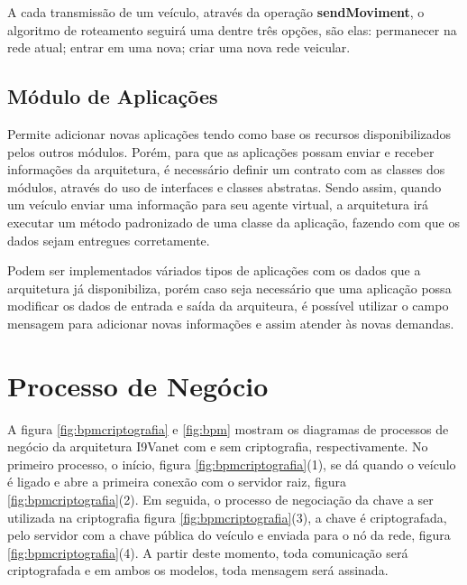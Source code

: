 \documentclass[
	12pt,				%
	oneside,			%
	a4paper,			%
	english,			%
	brazil				%
	]{abntex2ppgsi}
\begin{document}
A cada transmissão de um veículo, através da operação \textbf{sendMoviment}, o algoritmo de roteamento seguirá uma dentre três opções, são elas: permanecer na rede atual; entrar em uma nova; criar uma nova rede veicular.




\subsection{Módulo de Aplicações}
Permite adicionar novas aplicações tendo como base os recursos disponibilizados pelos outros módulos. Porém, para que as aplicações possam enviar e receber informações da arquitetura, é necessário definir um contrato com as classes dos módulos, através do uso de interfaces e classes abstratas. Sendo assim, quando um veículo enviar uma informação para seu agente virtual, a arquitetura irá executar um método padronizado de uma classe da aplicação, fazendo com que os dados sejam entregues corretamente.

Podem ser implementados váriados tipos de aplicações com os dados que a arquitetura já disponibiliza, porém caso seja necessário que uma aplicação possa modificar os dados de entrada e saída da arquiteura, é possível utilizar o campo mensagem para adicionar novas informações e assim atender às novas demandas.

\section{Processo de Negócio}

A figura \ref{fig:bpmcriptografia} e \ref{fig:bpm} mostram os diagramas de processos de negócio da arquitetura I9Vanet com e sem criptografia, respectivamente. No primeiro processo, o início, figura \ref{fig:bpmcriptografia}(1), se dá quando o veículo é ligado e abre a primeira conexão com o servidor raiz, figura \ref{fig:bpmcriptografia}(2). Em seguida, o processo de negociação da chave a ser utilizada na criptografia figura \ref{fig:bpmcriptografia}(3), a chave é criptografada, pelo servidor com a chave pública do veículo e enviada  para o nó da rede, figura \ref{fig:bpmcriptografia}(4). A partir deste momento, toda comunicação será criptografada e em ambos os modelos, toda mensagem será assinada. 
\end{document}

